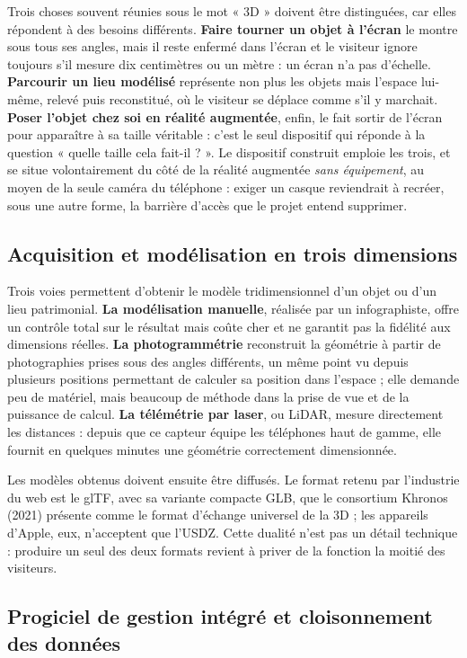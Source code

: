 Trois choses souvent réunies sous le mot « 3D » doivent être distinguées, car
elles répondent à des besoins différents. \textbf{Faire tourner un objet à
l'écran} le montre sous tous ses angles, mais il reste enfermé dans l'écran et
le visiteur ignore toujours s'il mesure dix centimètres ou un mètre : un écran
n'a pas d'échelle. \textbf{Parcourir un lieu modélisé} représente non plus les
objets mais l'espace lui-même, relevé puis reconstitué, où le visiteur se
déplace comme s'il y marchait. \textbf{Poser l'objet chez soi en réalité
augmentée}, enfin, le fait sortir de l'écran pour apparaître à sa taille
véritable : c'est le seul dispositif qui réponde à la question « quelle taille
cela fait-il ? ». Le dispositif construit emploie les trois, et se situe
volontairement du côté de la réalité augmentée \emph{sans équipement}, au moyen
de la seule caméra du téléphone : exiger un casque reviendrait à recréer, sous
une autre forme, la barrière d'accès que le projet entend supprimer.

\subsection{Acquisition et modélisation en trois dimensions}

Trois voies permettent d'obtenir le modèle tridimensionnel d'un objet ou d'un
lieu patrimonial. \textbf{La modélisation manuelle}, réalisée par un
infographiste, offre un contrôle total sur le résultat mais coûte cher et ne
garantit pas la fidélité aux dimensions réelles. \textbf{La photogrammétrie}
reconstruit la géométrie à partir de photographies prises sous des angles
différents, un même point vu depuis plusieurs positions permettant de calculer
sa position dans l'espace ; elle demande peu de matériel, mais beaucoup de
méthode dans la prise de vue et de la puissance de calcul. \textbf{La télémétrie
par laser}, ou LiDAR, mesure directement les distances : depuis que ce capteur
équipe les téléphones haut de gamme, elle fournit en quelques minutes une
géométrie correctement dimensionnée.

Les modèles obtenus doivent ensuite être diffusés. Le format retenu par
l'industrie du web est le glTF, avec sa variante compacte GLB, que le consortium
Khronos (2021) présente comme le format d'échange universel de la 3D ; les
appareils d'Apple, eux, n'acceptent que l'USDZ. Cette dualité n'est pas un
détail technique : produire un seul des deux formats revient à priver de la
fonction la moitié des visiteurs.

\subsection{Progiciel de gestion intégré et cloisonnement des données}

